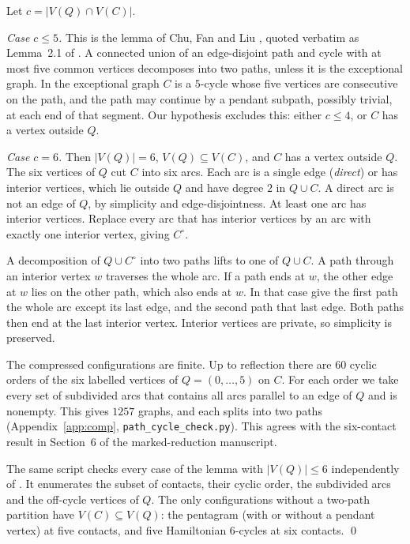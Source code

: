 \documentclass[11pt]{amsart}
\theoremstyle{definition}
\theoremstyle{remark}
\begin{document}
Let $c=|V(Q)\cap V(C)|$.

\emph{Case $c\le 5$.} This is the lemma of Chu, Fan and Liu \cite[Lemma 2.1]{CFL}, quoted
verbatim as Lemma~2.1 of \cite{CW}. A connected union of an edge-disjoint path and cycle with at
most five common vertices decomposes into two paths, unless it is the exceptional graph. In the
exceptional graph $C$ is a $5$-cycle whose five vertices are consecutive on the path, and the
path may continue by a pendant subpath, possibly trivial, at each end of that segment. Our hypothesis excludes this:
either $c\le 4$, or $C$ has a vertex outside $Q$.

\emph{Case $c=6$.} Then $|V(Q)|=6$, $V(Q)\subseteq V(C)$, and $C$ has a vertex outside $Q$. The
six vertices of $Q$ cut $C$ into six arcs. Each arc is a single edge (\emph{direct}) or has
interior vertices, which lie outside $Q$ and have degree $2$ in $Q\cup C$. A direct arc is not an
edge of $Q$, by simplicity and edge-disjointness. At least one arc has interior vertices. Replace
every arc that has interior vertices by an arc with exactly one interior vertex, giving $C^\circ$.

A decomposition of $Q\cup C^\circ$ into two paths lifts to one of $Q\cup C$. A path through an
interior vertex $w$ traverses the whole arc. If a path ends at $w$, the other edge at $w$ lies on
the other path, which also ends at $w$. In that case give the first path the whole arc except its
last edge, and the second path that last edge. Both paths then end at the last interior vertex.
Interior vertices are private, so simplicity is preserved.

The compressed configurations are finite. Up to reflection there are $60$ cyclic orders of the
six labelled vertices of $Q=(0,\dots,5)$ on $C$. For each order we take every set of subdivided
arcs that contains all arcs parallel to an edge of $Q$ and is nonempty. This gives
$1257$ graphs, and each splits into two paths (Appendix~\ref{app:comp},
\texttt{path\_cycle\_check.py}). This agrees with the six-contact result in Section~6 of the
marked-reduction manuscript.

The same script checks every case of the lemma with $|V(Q)|\le 6$ independently of
\cite{CFL}. It enumerates the subset of contacts, their cyclic order, the subdivided arcs and the
off-cycle vertices of $Q$. The only configurations without a two-path partition have
$V(C)\subseteq V(Q)$: the pentagram (with or without a pendant vertex) at five contacts, and five
Hamiltonian $6$-cycles at six contacts. \qed
\end{document}
